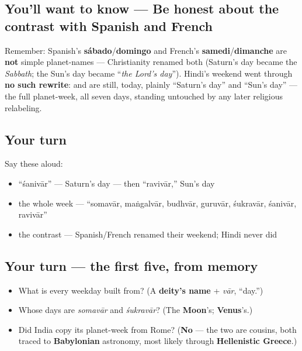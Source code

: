 \subsection*{You'll want to know — Be honest about the contrast with Spanish and French}
Remember: Spanish's \textbf{sábado}/\textbf{domingo} and French's \textbf{samedi}/\textbf{dimanche} are \textbf{not} simple planet-names — Christianity renamed both (Saturn's day became the \emph{Sabbath}; the Sun's day became \textquotedblleft{}\emph{the Lord's day}\textquotedblright{}). Hindi's weekend went through \textbf{no such rewrite}: \textbf{} and \textbf{} are still, today, plainly \textquotedblleft{}Saturn's day\textquotedblright{} and \textquotedblleft{}Sun's day\textquotedblright{} — the full planet-week, all seven days, standing untouched by any later religious relabeling.

\subsection*{Your turn}
Say these aloud:

\begin{itemize}
\raggedright
  \item \textquotedblleft{}śanivār\textquotedblright{} — Saturn's day — then \textquotedblleft{}ravivār,\textquotedblright{} Sun's day
  \item the whole week — \textquotedblleft{}somavār, maṅgalvār, budhvār, guruvār, śukravār, śanivār, ravivār\textquotedblright{}
  \item the contrast — Spanish/French renamed their weekend; Hindi never did
\end{itemize}

\subsection*{Your turn — the first five, from memory}
\begin{itemize}
\raggedright
  \item What is every weekday built from? (A \textbf{deity's name} + \textbf{} \emph{vār}, \textquotedblleft{}day.\textquotedblright{})
  \item Whose days are \emph{somavār} and \emph{śukravār}? (The \textbf{Moon}'s; \textbf{Venus}'s.)
  \item Did India copy its planet-week from Rome? (\textbf{No} — the two are cousins, both traced to \textbf{Babylonian} astronomy, most likely through \textbf{Hellenistic Greece}.)
\end{itemize}

